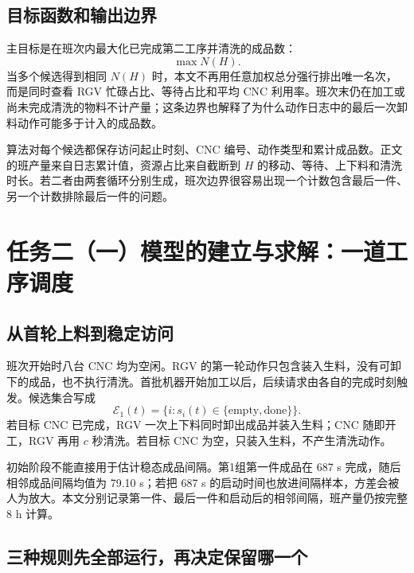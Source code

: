 \documentclass[UTF8,11pt,a4paper]{ctexart}
\begin{document}
\subsection{目标函数和输出边界}

主目标是在班次内最大化已完成第二工序并清洗的成品数：
\begin{equation}
\max N(H).
\label{eq:objective-b}
\end{equation}
当多个候选得到相同 $N(H)$ 时，本文不再用任意加权总分强行排出唯一名次，而是同时查看 RGV 忙碌占比、等待占比和平均 CNC 利用率。班次末仍在加工或尚未完成清洗的物料不计产量；这条边界也解释了为什么动作日志中的最后一次卸料动作可能多于计入的成品数。

算法对每个候选都保存访问起止时刻、CNC 编号、动作类型和累计成品数。正文的班产量来自日志累计值，资源占比来自截断到 $H$ 的移动、等待、上下料和清洗时长。若二者由两套循环分别生成，班次边界很容易出现一个计数包含最后一件、另一个计数排除最后一件的问题。

\label{mcm-q1-end}

\section{任务二（一）模型的建立与求解：一道工序调度}
\label{mcm-q2-start}

\subsection{从首轮上料到稳定访问}

班次开始时八台 CNC 均为空闲。RGV 的第一轮动作只包含装入生料，没有可卸下的成品，也不执行清洗。首批机器开始加工以后，后续请求由各自的完成时刻触发。候选集合写成
\begin{equation}
\mathcal E_1(t)=\{i:s_i(t)\in\{\mathrm{empty},\mathrm{done}\}\}.
\label{eq:eligible-one-b}
\end{equation}
若目标 CNC 已完成，RGV 一次上下料同时卸出成品并装入生料；CNC 随即开工，RGV 再用 $c$ 秒清洗。若目标 CNC 为空，只装入生料，不产生清洗动作。

初始阶段不能直接用于估计稳态成品间隔。第1组第一件成品在 687 s 完成，随后相邻成品间隔均值为 79.10 s；若把 687 s 的启动时间也放进间隔样本，方差会被人为放大。本文分别记录第一件、最后一件和启动后的相邻间隔，班产量仍按完整 8 h 计算。

\subsection{三种规则先全部运行，再决定保留哪一个}
\end{document}
